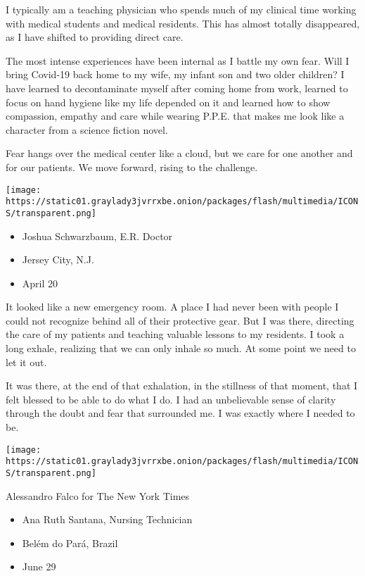 I typically am a teaching physician who spends much of my clinical time
working with medical students and medical residents. This has almost
totally disappeared, as I have shifted to providing direct care.

The most intense experiences have been internal as I battle my own fear.
Will I bring Covid-19 back home to my wife, my infant son and two older
children? I have learned to decontaminate myself after coming home from
work, learned to focus on hand hygiene like my life depended on it and
learned how to show compassion, empathy and care while wearing P.P.E.
that makes me look like a character from a science fiction novel.

Fear hangs over the medical center like a cloud, but we care for one
another and for our patients. We move forward, rising to the challenge.

\texttt{[image: https://static01.graylady3jvrrxbe.onion/packages/flash/multimedia/ICONS/transparent.png]}

\begin{itemize}
\tightlist
\item
  Joshua Schwarzbaum, E.R. Doctor
\item
  Jersey City, N.J.
\item
  April 20
\end{itemize}

It looked like a new emergency room. A place I had never been with
people I could not recognize behind all of their protective gear. But I
was there, directing the care of my patients and teaching valuable
lessons to my residents. I took a long exhale, realizing that we can
only inhale so much. At some point we need to let it out.

It was there, at the end of that exhalation, in the stillness of that
moment, that I felt blessed to be able to do what I do. I had an
unbelievable sense of clarity through the doubt and fear that surrounded
me. I was exactly where I needed to be.

\texttt{[image: https://static01.graylady3jvrrxbe.onion/packages/flash/multimedia/ICONS/transparent.png]}

Alessandro Falco for The New York Times

\begin{itemize}
\tightlist
\item
  Ana Ruth Santana, Nursing Technician
\item
  Belém do Pará, Brazil
\item
  June 29
\end{itemize}

